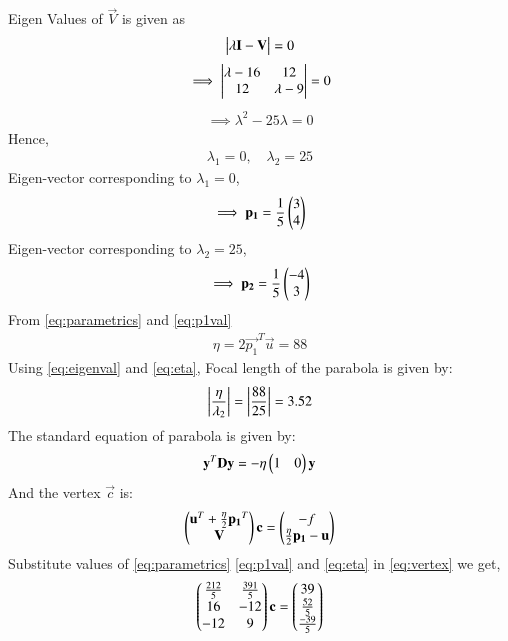 \documentclass[journal,12pt,twocolumn]{IEEEtran}
\begin{document}
Eigen Values of $\vec{V}$ is given as
\begin{align}
\begin{vmatrix}\lambda \mathbf{I}-\mathbf{V}\end{vmatrix} = 0
\end{align}
\begin{align}
\implies \begin{vmatrix}\lambda-16 & 12 \\ 12 & \lambda-9\end{vmatrix} =0
\end{align}
\begin{align}
\implies \lambda^2-25\lambda=0 \label{eq:chartistic}
\end{align}
Hence, 
\begin{align}
 \lambda_1=0, \quad  \lambda_2=25 \label{eq:eigenval}
\end{align}
Eigen-vector corresponding to $\lambda_1=0$,
\begin{align}
\implies \mathbf{p_1} = \frac{1}{5} \begin{pmatrix}3 \\ 4\end{pmatrix} \label{eq:p1val}
\end{align}
Eigen-vector corresponding to $\lambda_2=25$,
\begin{align}
\implies \mathbf{p_2} = \frac{1}{5} \begin{pmatrix}-4\\ 3\end{pmatrix} \label{eq:p2val}
\end{align}
From \eqref{eq:parametrics} and \eqref{eq:p1val}
\begin{align}
 \eta = 2\vec{p_1}^T\vec{u}= 88 \label{eq:eta} 
\end{align}
Using \eqref{eq:eigenval} and \eqref{eq:eta}, Focal length of the parabola is given by:
\begin{align}
 \left\vert\frac{\eta}{\lambda_2}\right\vert = \left\vert\frac{88}{25}\right\vert = 3.52 \label{eq:fl} 
\end{align}
The standard equation of parabola is given by:
\begin{align}
 \mathbf{y}^T\mathbf{D}\mathbf{y} = -\eta \begin{pmatrix}1 & 0\end{pmatrix}\mathbf{y} \label{eq:parabola}
\end{align}
And the vertex $\vec{c}$ is:
\begin{align}
 \begin{pmatrix}\mathbf{u}^T+\frac{\eta}{2} \mathbf{p_1}^T \\ \mathbf{V}\end{pmatrix}\mathbf{c} = \begin{pmatrix}-f \\ \frac{\eta}{2}\mathbf{p_1}-\mathbf{u}\end{pmatrix} \label{eq:vertex}
\end{align}
Substitute values of \eqref{eq:parametrics} \eqref{eq:p1val} and \eqref{eq:eta} in \eqref{eq:vertex} we get,
\begin{align}
\begin{pmatrix}\frac{212}{5} & \frac{391}{5} \\ 16 & -12 \\ -12 & 9\end{pmatrix}\mathbf{c}=\begin{pmatrix}39 \\ \frac{52}{5}\\ \frac{-39}{5}\end{pmatrix}
\end{align}
\end{document}
